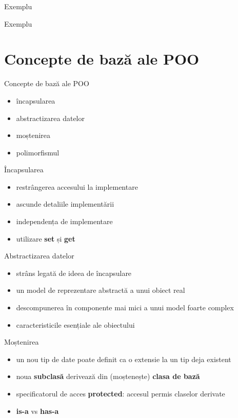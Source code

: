 \documentclass{beamer}
\begin{document}
\begin{frame}{Exemplu}
  \footnotesize{}
\end{frame}

\begin{frame}{Exemplu}
  \footnotesize{}
\end{frame}

\section{Concepte de bază ale POO}

\begin{frame}{Concepte de bază ale POO}
  \begin{itemize}
  \item încapsularea
  \item abstractizarea datelor
  \item moștenirea
  \item polimorfismul
  \end{itemize}
\end{frame}

\begin{frame}{Încapsularea}    
 \begin{itemize}
  \item restrângerea accesului la implementare
  \item ascunde detaliile implementării
  \item independența de implementare
  \item utilizare \textbf{set} și \textbf{get}
  \end{itemize}  
\end{frame}

\begin{frame}{Abstractizarea datelor}   
  \begin{itemize}
  \item strâns legată de ideea de încapsulare
  \item un model de reprezentare abstractă a unui obiect real
  \item descompunerea în componente mai mici a unui model foarte complex
  \item caracteristicile esențiale ale obiectului
  \end{itemize}  
\end{frame}

\begin{frame}{Moștenirea}
  \begin{itemize}
  \item un nou tip de date poate definit ca o extensie la un tip deja existent
  \item noua \textbf{subclasă} derivează din (moștenește) \textbf{clasa de bază}
  \item specificatorul de acces \textbf{protected}: accesul permis claselor derivate
  \item \textbf{is-a} vs \textbf{has-a}
  \end{itemize}    
\end{frame}
\end{document}
